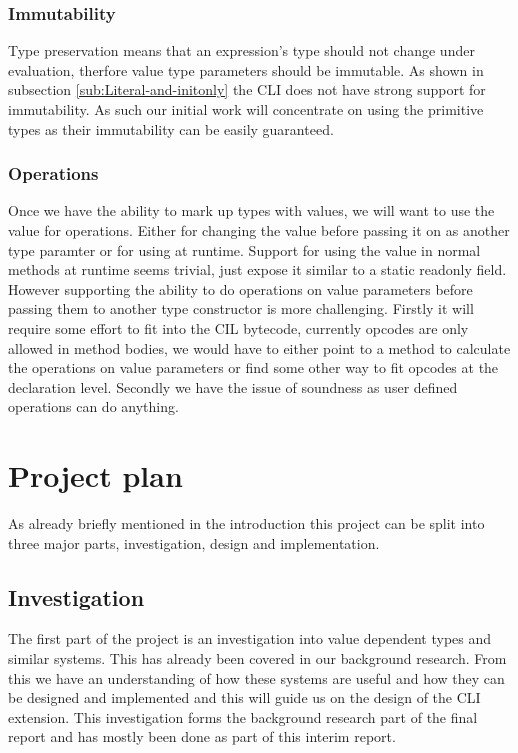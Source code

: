\documentclass[english]{report}
\begin{document}
\subsection{Immutability}

Type preservation means that an expression's type should not change
under evaluation, therfore value type parameters should be immutable.
As shown in subsection \ref{sub:Literal-and-initonly} the CLI does
not have strong support for immutability. As such our initial work
will concentrate on using the primitive types as their immutability
can be easily guaranteed.


\subsection{Operations}

Once we have the ability to mark up types with values, we will want
to use the value for operations. Either for changing the value before
passing it on as another type paramter or for using at runtime. Support
for using the value in normal methods at runtime seems trivial, just
expose it similar to a static readonly field. However supporting the
ability to do operations on value parameters before passing them to
another type constructor is more challenging. Firstly it will require
some effort to fit into the CIL bytecode, currently opcodes are only
allowed in method bodies, we would have to either point to a method
to calculate the operations on value parameters or find some other
way to fit opcodes at the declaration level. Secondly we have the
issue of soundness as user defined operations can do anything.


\chapter{Project plan}

As already briefly mentioned in the introduction this project can
be split into three major parts, investigation, design and implementation.


\section{Investigation}

The first part of the project is an investigation into value dependent
types and similar systems. This has already been covered in our background
research. From this we have an understanding of how these systems
are useful and how they can be designed and implemented and this will
guide us on the design of the CLI extension. This investigation forms
the background research part of the final report and has mostly been
done as part of this interim report.
\end{document}
